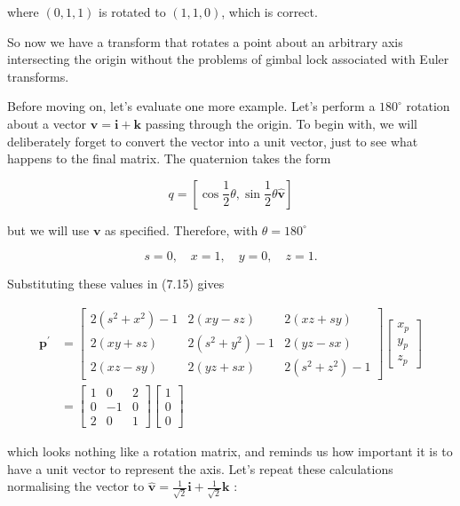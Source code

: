 where $(0,1,1)$ is rotated to $(1,1,0)$, which is correct.

So now we have a transform that rotates a point about an arbitrary axis intersecting the origin without the problems of gimbal lock associated with Euler transforms.

Before moving on, let's evaluate one more example. Let's perform a $180^{\circ}$ rotation about a vector $\mathbf{v}=\mathbf{i}+\mathbf{k}$ passing through the origin. To begin with, we will deliberately forget to convert the vector into a unit vector, just to see what happens to the final matrix. The quaternion takes the form

$$
q=\left[\cos \frac{1}{2} \theta, \sin \frac{1}{2} \theta \hat{\mathbf{v}}\right]
$$

but we will use $\mathbf{v}$ as specified. Therefore, with $\theta=180^{\circ}$

$$
s=0, \quad x=1, \quad y=0, \quad z=1 .
$$

Substituting these values in (7.15) gives

$$
\begin{aligned}
\mathbf{p}^{\prime} & =\left[\begin{array}{ccc}
2\left(s^{2}+x^{2}\right)-1 & 2(x y-s z) & 2(x z+s y) \\
2(x y+s z) & 2\left(s^{2}+y^{2}\right)-1 & 2(y z-s x) \\
2(x z-s y) & 2(y z+s x) & 2\left(s^{2}+z^{2}\right)-1
\end{array}\right]\left[\begin{array}{l}
x_{p} \\
y_{p} \\
z_{p}
\end{array}\right] \\
& =\left[\begin{array}{ccc}
1 & 0 & 2 \\
0 & -1 & 0 \\
2 & 0 & 1
\end{array}\right]\left[\begin{array}{l}
1 \\
0 \\
0
\end{array}\right]
\end{aligned}
$$

which looks nothing like a rotation matrix, and reminds us how important it is to have a unit vector to represent the axis. Let's repeat these calculations normalising the vector to $\hat{\mathbf{v}}=\frac{1}{\sqrt{2}} \mathbf{i}+\frac{1}{\sqrt{2}} \mathbf{k}$ :


